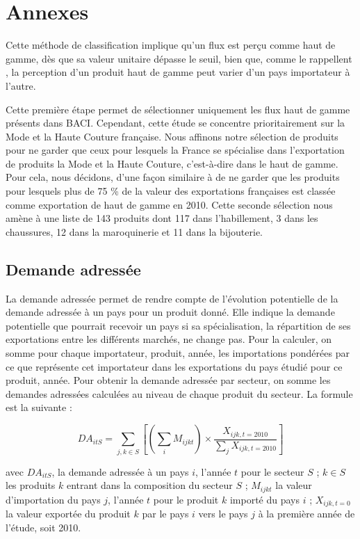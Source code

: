 \documentclass[french,10pt,a4paper]{article}
\newenvironment{annexes}{
    \section*{Annexes}
    \addcontentsline{toc}{section}{Annexes}
    \setstretch{2} %
}{
    \setstretch{1} %
}
\begin{document}
\begin{annexes}
Cette méthode de classification implique qu'un flux est perçu comme haut de gamme, dès que sa valeur unitaire dépasse le seuil, bien que, comme le rappellent \cite{Martin2015}, la perception d'un produit haut de gamme peut varier d'un pays importateur à l'autre. 

Cette première étape permet de sélectionner uniquement les flux haut de gamme présents dans BACI. Cependant, cette étude se concentre prioritairement sur la Mode et la Haute Couture française. Nous affinons notre sélection de produits pour ne garder que ceux pour lesquels la France se spécialise dans l'exportation de produits la Mode et la Haute Couture, c'est-à-dire dans le haut de gamme. Pour cela, nous décidons, d'une façon similaire à \cite{Martin2015} de ne garder que les produits pour lesquels plus de 75 \% de la valeur des exportations françaises est classée comme exportation de haut de gamme en 2010. Cette seconde sélection nous amène à une liste de 143 produits dont 117 dans l'habillement, 3 dans les chaussures, 12 dans la maroquinerie et 11 dans la bijouterie.

\subsection*{Demande adressée}

La demande adressée permet de rendre compte de l'évolution potentielle de la demande adressée à un pays pour un produit donné. Elle indique la demande potentielle que pourrait recevoir un pays si sa spécialisation, la répartition de ses exportations entre les différents marchés, ne change pas. Pour la calculer, on somme pour chaque importateur, produit, année, les importations pondérées par ce que représente cet importateur dans les exportations du pays étudié pour ce produit, année. Pour obtenir la demande adressée par secteur, on somme les demandes adressées calculées au niveau de chaque produit du secteur. La formule est la suivante :

\begin{equation}
\label{eq:1}
DA_{itS} = \sum_{j,k \in S} \left[ \left( \sum_{i} M_{ijkt} \right) \times \frac{X_{ijk,t=2010}}{\sum_{j}X_{ijk,t=2010}}\right]  
\end{equation}

\noindent avec $DA_{itS}$, la demande adressée à un pays $i$, l'année $t$ pour le secteur $S$ ; $k \in S$ les produits $k$ entrant dans la composition du secteur $S$ ; $M_{ijkt}$ la valeur d'importation du pays $j$, l'année $t$ pour le produit $k$ importé du pays $i$ ; $X_{ijk, t=0}$ la valeur exportée du produit $k$ par le pays $i$ vers le pays $j$ à la première année de l'étude, soit 2010.


\end{annexes}
\end{document}
